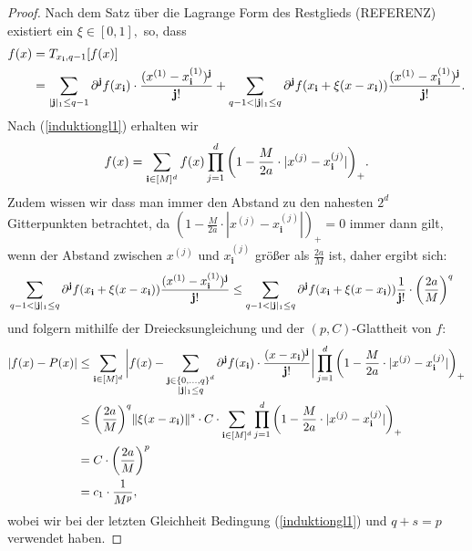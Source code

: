 \begin{proof}
Nach dem Satz über die Lagrange Form des Restglieds (REFERENZ) existiert ein $\xi \in [0, 1],$ so, dass 
\begin{equation*}
\begin{split}
f(x) & = T_{x_{\mathbf{i}},q - 1}[f(x)] \\
& = \sum_{|\mathbf{j}|_1 \leq q - 1}  \partial^{\mathbf{j}}f(x_{\mathbf{i}}) \cdot \frac{ (x^{(1)} - x_{\mathbf{i}}^{(1)})^{\mathbf{j}} }{\mathbf{j}!} + \sum_{q - 1 < |\mathbf{j}|_1 \leq q} \partial^{\mathbf{j}}f(x_{\mathbf{i}} + \xi(x - x_{\mathbf{i}})) \frac{ (x^{(1)} - x_{\mathbf{i}}^{(1)})^{\mathbf{j}} }{\mathbf{j}!}.
\end{split}
\end{equation*}
Nach (\ref{induktiongl1}) erhalten wir 
$$f(x) = \sum_{\mathbf{i} \in [M]^d} f(x) \prod_{j = 1}^d \bigg(1 - \frac{M}{2a} \cdot |x^{(j)} - x_{\mathbf{i}}^{(j)}|\bigg)_+.$$ Zudem wissen wir dass man immer den Abstand zu den nahesten $2^d$ Gitterpunkten betrachtet, da  $(1 - \frac{M}{2a} \cdot |x^{(j)} - x_{\mathbf{i}}^{(j)}|)_+ = 0$ immer dann gilt, wenn der Abstand zwischen $x^{(j)}$ und $x_{\mathbf{i}}^{(j)}$ größer als $\frac{2a}{M}$ ist, daher ergibt sich:
\begin{equation*}
\begin{split}
&\sum_{q - 1 < |\mathbf{j}|_1 \leq q} \partial^{\mathbf{j}}f(x_{\mathbf{i}} + \xi(x - x_{\mathbf{i}})) \frac{ (x^{(1)} - x_{\mathbf{i}}^{(1)})^{\mathbf{j}} }{\mathbf{j}!} \leq \sum_{q - 1 < |\mathbf{j}|_1 \leq q} \partial^{\mathbf{j}}f(x_{\mathbf{i}} + \xi(x - x_{\mathbf{i}})) \frac{1}{\mathbf{j}!} \cdot \bigg(\frac{2a}{M}\bigg)^q
\end{split}
\end{equation*} 
und folgern mithilfe der Dreiecksungleichung und der $(p,C)$-Glattheit von $f$:
\begin{equation*}
\begin{split}
|f(x) - P(x)| & \leq \sum_{\mathbf{i} \in [M]^d} \bigg|f(x) - \sum_{\substack{\mathbf{j} \in \{0,\dots,q\}^d \\|\mathbf{j}|_1 \leq q}} \partial^{\mathbf{j}}f(x_{\mathbf{i}}) \cdot \frac{(x - x_{\mathbf{i}})^{\mathbf{j}}}{\mathbf{j}!}\bigg| \prod_{j = 1}^d \bigg(1 - \frac{M}{2a} \cdot |x^{(j)} - x_{\mathbf{i}}^{(j)}|\bigg)_+ \\
& \leq \bigg(\frac{2a}{M}\bigg)^q \|\xi(x - x_{\mathbf{i}}) \|^s \cdot C \cdot \sum_{\mathbf{i} \in [M]^d} \prod_{j = 1}^d \bigg(1 - \frac{M}{2a} \cdot |x^{(j)} - x_{\mathbf{i}}^{(j)}|\bigg)_+ \\
& = C \cdot \bigg(\frac{2a}{M}\bigg)^p \\
& = c_1 \cdot \frac{1}{M^p},
\end{split}
\end{equation*}
wobei wir bei der letzten Gleichheit Bedingung (\ref{induktiongl1}) und $q + s = p$ verwendet haben.
\end{proof}

